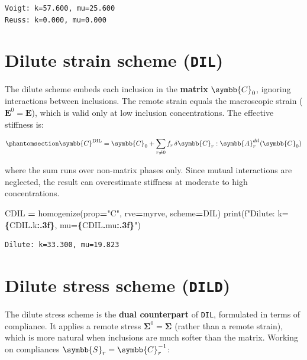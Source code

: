 \documentclass[
  a4paper,
  numbers=noendperiod,
  DIV=12]{scrreprt}
\newenvironment{Shaded}{\begin{snugshade}}{\end{snugshade}}
\newcommand{\BuiltInTok}[1]{#1}
\newcommand{\NormalTok}[1]{#1}
\newcommand{\OperatorTok}[1]{\textcolor[rgb]{0.81,0.36,0.00}{\textbf{#1}}}
\newcommand{\SpecialCharTok}[1]{\textcolor[rgb]{0.81,0.36,0.00}{\textbf{#1}}}
\newcommand{\SpecialStringTok}[1]{\textcolor[rgb]{0.31,0.60,0.02}{#1}}
\newcommand{\StringTok}[1]{\textcolor[rgb]{0.31,0.60,0.02}{#1}}
\newcommand{\uu}[1]{{\symbf{{#1}}}}
\newcommand{\uuuu}[1]{{\symbb{{#1}}}}
\newcommand{\E}{{\uu{{E}}}}
\newcommand{\Sig}{{\uu{{\Sigma}}}}
\begin{document}
\begin{verbatim}
Voigt: k=57.600, mu=25.600
Reuss: k=0.000, mu=0.000
\end{verbatim}

\section{\texorpdfstring{Dilute strain scheme
(\texttt{DIL})}{Dilute strain scheme (DIL)}}\label{sec-DIL}

The dilute scheme embeds each inclusion in the \textbf{matrix}
\(\uuuu{C}_0\), ignoring interactions between inclusions. The remote
strain equals the macroscopic strain (\(\E^0 = \E\)), which is valid
only at low inclusion concentrations. The effective stiffness is:

\begin{equation}\protect\phantomsection\label{eq-DIL}{
\uuuu{C}^\textrm{DIL} = \uuuu{C}_0 + \sum_{r \neq 0} f_r \,\delta\uuuu{C}_r : \uuuu{A}_r^{dil}(\uuuu{C}_0)
}\end{equation}

where the sum runs over non-matrix phases only. Since mutual
interactions are neglected, the result can overestimate stiffness at
moderate to high concentrations.

\begin{Shaded}
\begin{Highlighting}[]
\NormalTok{CDIL }\OperatorTok{=}\NormalTok{ homogenize(prop}\OperatorTok{=}\StringTok{"C"}\NormalTok{, rve}\OperatorTok{=}\NormalTok{myrve, scheme}\OperatorTok{=}\NormalTok{DIL)}
\BuiltInTok{print}\NormalTok{(}\SpecialStringTok{f"Dilute: k=}\SpecialCharTok{\{}\NormalTok{CDIL}\SpecialCharTok{.}\NormalTok{k}\SpecialCharTok{:.3f\}}\SpecialStringTok{, mu=}\SpecialCharTok{\{}\NormalTok{CDIL}\SpecialCharTok{.}\NormalTok{mu}\SpecialCharTok{:.3f\}}\SpecialStringTok{"}\NormalTok{)}
\end{Highlighting}
\end{Shaded}

\begin{verbatim}
Dilute: k=33.300, mu=19.823
\end{verbatim}

\section{\texorpdfstring{Dilute stress scheme
(\texttt{DILD})}{Dilute stress scheme (DILD)}}\label{sec-DILD}

The dilute stress scheme is the \textbf{dual counterpart} of
\texttt{DIL}, formulated in terms of compliance. It applies a remote
stress \(\Sig^0 = \Sig\) (rather than a remote strain), which is more
natural when inclusions are much softer than the matrix. Working on
compliances \(\uuuu{S}_r = \uuuu{C}_r^{-1}\):
\end{document}
